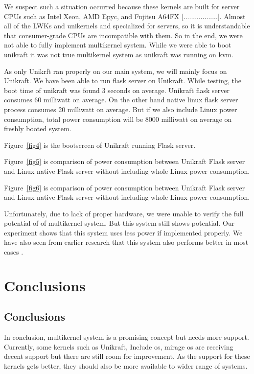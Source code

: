 \documentclass[11pt]{article}       %
\begin{document}
We suspect such a situation occurred because these kernels are built for server CPUs such as Intel Xeon, AMD Epyc, and Fujitsu A64FX [..................]. Almost all of the LWKs and unikernels and specialized for servers, so it is understandable that consumer-grade CPUs are incompatible with them. So in the end, we were not able to fully implement multikernel system. While we were able to boot unikraft it was not true multikernel system as unikraft was running on kvm.


As only Unikrft ran properly on our main system, we will mainly focus on Unikraft. We have been able to run flask server on Unikraft. While testing, the boot time of unikraft was found 3 seconds on average. Unikraft flask server consumes 60 milliwatt on average. On the other hand native linux flask server process consumes 20 milliwatt on average. But if we also include Linux power consumption, total power consumption will be 8000 milliwatt on average on freshly booted system.

Figure~\ref{fig4} is the bootscreen of Unikraft running Flask server.

Figure~\ref{fig5} is comparison of power consumption between Unikraft Flask server and Linux native Flask server without including whole Linux power consumption. 


Figure~\ref{fig6} is comparison of power consumption between Unikraft Flask server and Linux native Flask server without including whole Linux power consumption.


Unfortunately, due to lack of proper hardware, we were unable to verify the full potential of of multikernel system. But this system still shows potential. Our experiment shows that this system uses less power if implemented properly. We have also seen from earlier research that this system also performs better in most cases \cite{DEL14}. 



\section{Conclusions} \label{concl}


\subsection{Conclusions} 
In conclusion, multikernel system is a promising concept but needs more support. Currently, some kernels such as Unikraft, Include os, mirage os are receiving decent support but there are still room for improvement. As the support for these kernels gets better, they should also be more available to wider range of systems.
\end{document}
